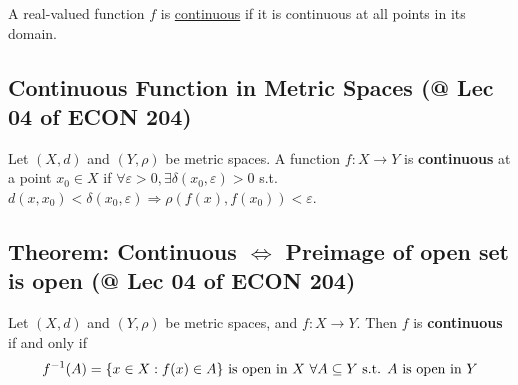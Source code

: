\documentclass[11pt]{elegantbook}
\begin{document}
\begin{definition}
    \normalfont
    A real-valued function $f$ is \underline{continuous} if it is continuous at all points in its domain.
\end{definition}

\subsection{Continuous Function in Metric Spaces \small{(@ Lec 04 of ECON 204)}}
\begin{definition}
\normalfont
    Let $(X, d)$ and $(Y, \rho)$ be metric spaces. A function $f : X \rightarrow Y$ is \textbf{continuous} at a point $x_0 \in X$ if $\forall \varepsilon > 0, \exists \delta(x_0, \varepsilon) > 0$ s.t. $d(x, x_0) < \delta(x_0, \varepsilon) \Rightarrow  \rho(f(x), f(x_0)) < \varepsilon$.
\end{definition}

\subsection{Theorem: Continuous $\Leftrightarrow$ Preimage of open set is open \small{(@ Lec 04 of ECON 204)}}
\begin{theorem}\label{Preimage of open set is open}
    Let $(X, d)$ and $(Y, \rho)$ be metric spaces, and $f : X \rightarrow Y$. Then $f$ is \textbf{continuous} if and only if
    $$f^{-1}(A)=\{x\in X: f(x)\in A\} \textnormal{ is open in $X$ $\forall A\subseteq Y$ s.t. $A$ is open in $Y$}$$
\end{theorem}
\end{document}
